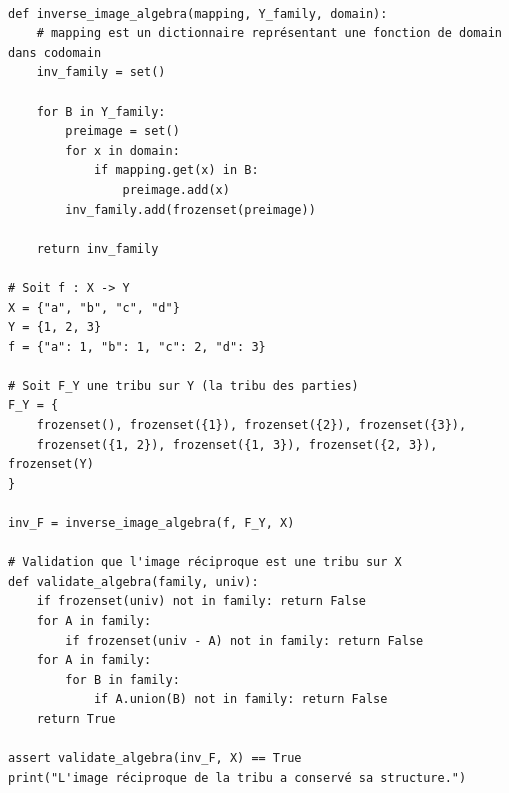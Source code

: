 \documentclass[11pt,a4paper]{article}
\begin{document}
\begin{lstlisting}

def inverse_image_algebra(mapping, Y_family, domain):
    # mapping est un dictionnaire représentant une fonction de domain dans codomain
    inv_family = set()

    for B in Y_family:
        preimage = set()
        for x in domain:
            if mapping.get(x) in B:
                preimage.add(x)
        inv_family.add(frozenset(preimage))

    return inv_family

# Soit f : X -> Y
X = {"a", "b", "c", "d"}
Y = {1, 2, 3}
f = {"a": 1, "b": 1, "c": 2, "d": 3}

# Soit F_Y une tribu sur Y (la tribu des parties)
F_Y = {
    frozenset(), frozenset({1}), frozenset({2}), frozenset({3}),
    frozenset({1, 2}), frozenset({1, 3}), frozenset({2, 3}), frozenset(Y)
}

inv_F = inverse_image_algebra(f, F_Y, X)

# Validation que l'image réciproque est une tribu sur X
def validate_algebra(family, univ):
    if frozenset(univ) not in family: return False
    for A in family:
        if frozenset(univ - A) not in family: return False
    for A in family:
        for B in family:
            if A.union(B) not in family: return False
    return True

assert validate_algebra(inv_F, X) == True
print("L'image réciproque de la tribu a conservé sa structure.")

\end{lstlisting}
\end{document}
